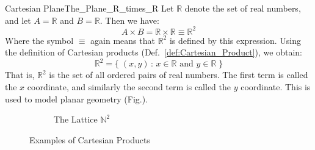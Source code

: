         \begin{lexample}{Cartesian Plane}{The_Plane_R_times_R}
            Let $\mathbb{R}$ denote the set of real numbers, and let
            $A=\mathbb{R}$ and $B=\mathbb{R}$. Then we have:
            \begin{equation}
                A\times{B}=\mathbb{R}\times\mathbb{R}\equiv\mathbb{R}^{2}
            \end{equation}
            Where the symbol $\equiv$ again means that $\mathbb{R}^{2}$ is
            defined by this expression. Using the definition of Cartesian
            products (Def.~\ref{def:Cartesian_Product}), we obtain:
            \begin{equation}
                \mathbb{R}^{2}=\{\;(x,y)\,:\,x\in\mathbb{R}
                                   \textrm{ and }y\in\mathbb{R}\;\}
            \end{equation}
            That is, $\mathbb{R}^{2}$ is the set of all ordered pairs of real
            numbers. The first term is called the $x$ coordinate, and
            similarly the second term is called the $y$ coordinate. This is
            used to model planar geometry (Fig.).
        \end{lexample}
        \begin{figure}[H]
            \centering
            \begin{subfigure}[b]{0.49\textwidth}
                \centering
                \resizebox{\textwidth}{!}{
                }
                \label{fig:Cartesian_Plane}
            \end{subfigure}
            \begin{subfigure}[b]{0.49\textwidth}
                \centering
                \resizebox{\textwidth}{!}{%
                }
                \caption{The Lattice $\mathbb{N}^{2}$}
                \label{fig:Lattice_Cart_Prod_of_N_with_N}
            \end{subfigure}
            \caption{Examples of Cartesian Products}
            \label{fig:Cartesian_Products_Examples}
        \end{figure}
